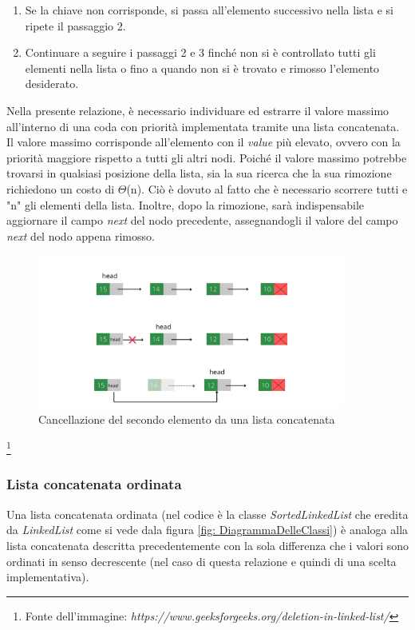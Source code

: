 \documentclass{article}
\begin{document}
\begin{itemize}
\begin{enumerate}
    \item Se la chiave non corrisponde, si passa all'elemento successivo nella lista e si ripete il passaggio 2.

    \item Continuare a seguire i passaggi 2 e 3 finché non si è controllato tutti gli elementi nella lista o fino a quando non si è trovato e rimosso l'elemento desiderato.
    
    \end{enumerate}

    Nella presente relazione, è necessario individuare ed estrarre il valore massimo all'interno di una coda con priorità implementata tramite una lista concatenata. Il valore massimo corrisponde all'elemento con il \emph{value} più elevato, ovvero con la priorità maggiore rispetto a tutti gli altri nodi. Poiché il valore massimo potrebbe trovarsi in qualsiasi posizione della lista, sia la sua ricerca che la sua rimozione richiedono un costo di $\Theta$(n). Ciò è dovuto al fatto che è necessario scorrere tutti e "n" gli elementi della lista. Inoltre, dopo la rimozione, sarà indispensabile aggiornare il campo \textit{next} del nodo precedente, assegnandogli il valore del campo \textit{next} del nodo appena rimosso. 

    \begin{figure}[H]
    \includegraphics[width=0.9\textwidth]{Images/Linked3.png}
    \centering
    \caption{Cancellazione del secondo elemento da una lista concatenata}
    \label{fig: Linked3}
    \end{figure}
    
    \footnote{Fonte dell'immagine: \textit{https://www.geeksforgeeks.org/deletion-in-linked-list/}}

\end{itemize}

\subsubsection{Lista concatenata ordinata}
Una lista concatenata ordinata (nel codice è la classe \textit{SortedLinkedList} che eredita da \textit{LinkedList} come si vede dala figura \ref{fig: DiagrammaDelleClassi}) è analoga alla lista concatenata descritta precedentemente con la sola differenza che i valori sono ordinati in senso decrescente (nel caso di questa relazione e quindi di una scelta implementativa).
\end{document}

